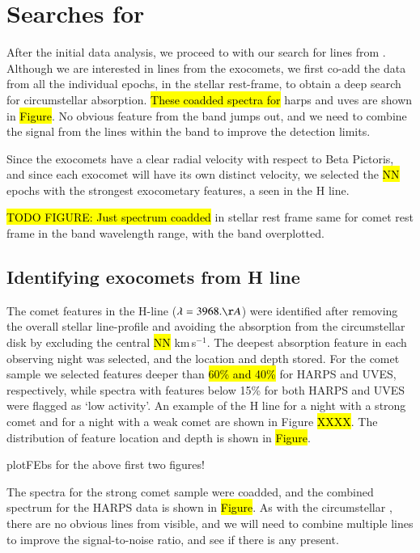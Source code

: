 \documentclass{aa}
\newcommand{\bp}{Beta Pictoris}
\begin{document}
\section{Searches for }\label{sect:CNsearch}

After the initial data analysis, we proceed to with our search for lines from .
%
Although we are interested in lines from the exocomets, we first co-add the data from all the individual epochs, in the stellar rest-frame, to obtain a deep search for circumstellar  absorption.
%
\hl{These coadded spectra for }\ac{harps} and \ac{uves} are shown in \hl{Figure}.
%
No obvious feature from the  band jumps out, and we need to combine the signal from the lines within the  band to improve the detection limits.

Since the exocomets have a clear radial velocity with respect to \bp{}, and since each exocomet will have its own distinct velocity, we selected the \hl{NN} epochs with the strongest exocometary features, a seen in the  H line. 

\hl{TODO FIGURE: Just spectrum coadded} in stellar rest frame same for comet rest frame in the  band wavelength range, with the  band overplotted.

\subsection{Identifying exocomets from  H line}\label{sect:FEBid}
The comet features in the  H-line ($\lambda=3968. \AA$) were identified after removing the overall stellar line-profile and avoiding the absorption from the circumstellar disk by excluding the central \hl{NN} km\,s$^{-1}$.
%
The deepest absorption feature in each observing night was selected, and the location and depth stored.
%
For the comet sample we selected features deeper than \hl{60\% and 40\%} for HARPS and UVES, respectively, while spectra with features below 15\% for both HARPS and UVES were flagged as `low activity'.
%
An example of the  H line for a night with a strong comet and for a night with a weak comet are shown in Figure \hl{XXXX}.
%
The distribution of feature location and depth is shown in \hl{Figure}.

plotFEbs for the above first two figures!

The spectra for the strong comet sample were coadded, and the combined spectrum for the HARPS data is shown in \hl{Figure}.
%
As with the circumstellar , there are no obvious lines from  visible, and we will need to combine multiple lines to improve the signal-to-noise ratio, and see if there is any  present. 
%
%
%
%
\end{document}
